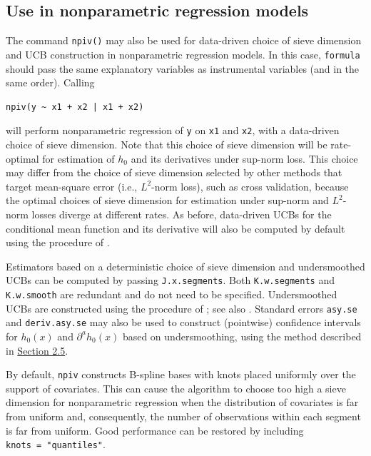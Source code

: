 \documentclass[
]{jss}
\begin{document}
\subsection{Use in nonparametric regression
models}\label{use-in-nonparametric-regression-models}

The command \texttt{npiv()} may also be used for data-driven choice of
sieve dimension and UCB construction in nonparametric regression models.
In this case, \texttt{formula} should pass the same explanatory
variables as instrumental variables (and in the same order). Calling

\begin{verbatim}
npiv(y ~ x1 + x2 | x1 + x2)
\end{verbatim}

will perform nonparametric regression of \texttt{y} on \texttt{x1} and
\texttt{x2}, with a data-driven choice of sieve dimension. Note that
this choice of sieve dimension will be rate-optimal for estimation of
\(h_0\) and its derivatives under sup-norm loss. This choice may differ
from the choice of sieve dimension selected by other methods that target
mean-square error (i.e., \(L^2\)-norm loss), such as cross validation,
because the optimal choices of sieve dimension for estimation under
sup-norm and \(L^2\)-norm losses diverge at different rates. As before,
data-driven UCBs for the conditional mean function and its derivative
will also be computed by default using the procedure of \citet{CCK}.

Estimators based on a deterministic choice of sieve dimension and
undersmoothed UCBs can be computed by passing \texttt{J.x.segments}.
Both \texttt{K.w.segments} and \texttt{K.w.smooth} are redundant and do
not need to be specified. Undersmoothed UCBs are constructed using the
procedure of \citet{CCQE}; see also \citet{BCCK}. Standard errors
\texttt{asy.se} and \texttt{deriv.asy.se} may also be used to construct
(pointwise) confidence intervals for \(h_0(x)\) and
\(\partial^a h_0(x)\) based on undersmoothing, using the method
described in \hyperref[pw]{Section 2.5}.

By default, \texttt{npiv} constructs B-spline bases with knots placed
uniformly over the support of covariates. This can cause the algorithm
to choose too high a sieve dimension for nonparametric regression when
the distribution of covariates is far from uniform and, consequently,
the number of observations within each segment is far from uniform. Good
performance can be restored by including \texttt{knots\ =\ "quantiles"}.
\end{document}
